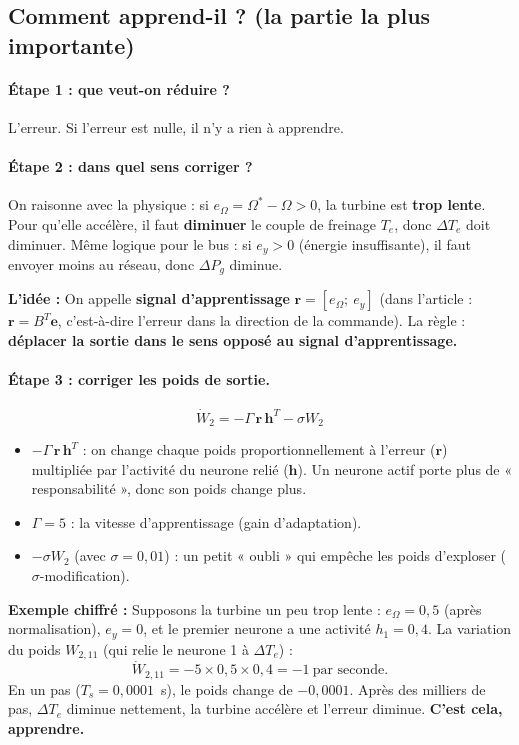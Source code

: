 \documentclass[11pt,a4paper]{article}
\newcommand{\bv}[1]{\boldsymbol{#1}}
\newcommand{\Idee}{\textbf{L'idée : }}
\newcommand{\Exemple}{\textbf{Exemple chiffré : }}
\begin{document}
\subsection{Comment apprend-il ? (la partie la plus importante)}

\paragraph{Étape 1 : que veut-on réduire ?} L'erreur. Si l'erreur est nulle, il n'y a rien à apprendre.

\paragraph{Étape 2 : dans quel sens corriger ?}
On raisonne avec la physique : si $e_\Omega = \Omega^*-\Omega > 0$, la turbine est \textbf{trop lente}.
Pour qu'elle accélère, il faut \textbf{diminuer} le couple de freinage $T_e$, donc $\Delta T_e$ doit diminuer.
Même logique pour le bus : si $e_y>0$ (énergie insuffisante), il faut envoyer moins au réseau, donc $\Delta P_g$ diminue.
\begin{idee}
\Idee
On appelle \textbf{signal d'apprentissage} $\bv{r} = [e_\Omega;\ e_y]$ (dans l'article : $\bv{r}=B^T\bv{e}$,
c'est-à-dire l'erreur dans la direction de la commande).
La règle : \textbf{déplacer la sortie dans le sens opposé au signal d'apprentissage.}
\end{idee}

\paragraph{Étape 3 : corriger les poids de sortie.}
\begin{equation}
\dot W_2 = -\Gamma\,\bv{r}\,\bv{h}^T - \sigma W_2
\end{equation}
\begin{itemize}
\item $-\Gamma\,\bv{r}\,\bv{h}^T$ : on change chaque poids proportionnellement à l'erreur ($\bv{r}$) multipliée
par l'activité du neurone relié ($\bv{h}$). Un neurone actif porte plus de « responsabilité », donc son poids change plus.
\item $\Gamma=5$ : la vitesse d'apprentissage (gain d'adaptation).
\item $-\sigma W_2$ (avec $\sigma=0{,}01$) : un petit « oubli » qui empêche les poids d'exploser ($\sigma$-modification).
\end{itemize}
\begin{exemple}
\Exemple
Supposons la turbine un peu trop lente : $e_\Omega = 0{,}5$ (après normalisation), $e_y=0$, et le premier
neurone a une activité $h_1 = 0{,}4$. La variation du poids $W_{2,11}$ (qui relie le neurone 1 à $\Delta T_e$) :
\[
\dot W_{2,11} = -5\times 0{,}5\times 0{,}4 = -1\ \text{par seconde}.
\]
En un pas ($T_s = 0{,}0001$~s), le poids change de $-0{,}0001$. Après des milliers de pas, $\Delta T_e$
diminue nettement, la turbine accélère et l'erreur diminue. \textbf{C'est cela, apprendre.}
\end{exemple}
\end{document}
